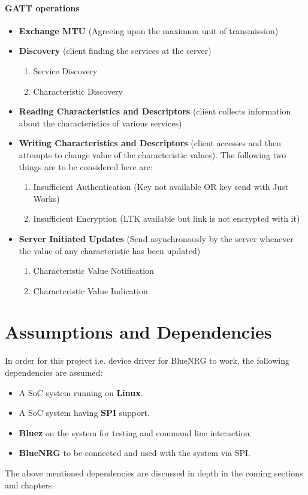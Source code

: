 \paragraph{GATT operations}
\begin{itemize}
	\item \textbf{Exchange MTU} (Agreeing upon the maximum unit of transmission)
	\item \textbf{Discovery} (client finding the services at the server)
		\begin{enumerate}
			\item Service Discovery
			\item Characteristic Discovery
		\end{enumerate}
	\item \textbf{Reading Characteristics and Descriptors} (client collects information about the characteristics of various services)
	\item \textbf{Writing Characteristics and Descriptors} (client accesses and then attempts to change value of the characteristic values). The following two things are to be considered here are:
		\begin{enumerate}
			\item Insufficient Authentication (Key not available OR key send with Just Works)
			\item Insufficient Encryption (LTK available but link is not encrypted with it)
		\end{enumerate}
	\item \textbf{Server Initiated Updates} (Send asynchronously by the server whenever the value of any characteristic has been updated)
		\begin{enumerate}
			\item Characteristic Value Notification
			\item Characteristic Value Indication
		\end{enumerate}
\end{itemize}
\section{Assumptions and Dependencies}
In order for this project i.e. device driver for BlueNRG to work, the following dependencies are assumed:
\begin{itemize}
	\item A SoC system running on \textbf{Linux}.
	\item A SoC system having \textbf{SPI} support.
	\item \textbf{Bluez} on the system for testing and command line interaction.
	\item \textbf{BlueNRG} to be connected and used with the system via SPI.
\end{itemize}
The above mentioned dependencies are discussed in depth in the coming sections and chapters.
